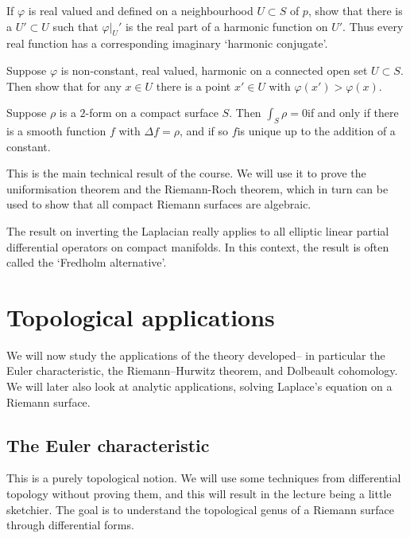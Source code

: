 \begin{exercise}
    If \(\varphi\) is real valued and defined on a neighbourhood \(U\subset
    S\) of \(p\), show that there is a \(U'\subset U\) such that
    \(\varphi|_U'\) is the real part of a harmonic function on \(U'\). Thus
    every real function has a corresponding imaginary `harmonic conjugate'.
\end{exercise}

\begin{exercise}
    Suppose \(\varphi\) is non-constant, real valued, harmonic on a
    connected open set \(U\subset S\). Then show that for any \(x\in U\) there
    is a point \(x'\in U\) with \(\varphi(x')>\varphi(x)\).
\end{exercise}

\begin{theorem}
    \label{thm:laplace-inversion}
    Suppose \(\rho\) is a \(2\)-form on a compact surface \(S\). Then
    \(\int_S\rho=0\)if and only if there is a smooth function \(f\) with
    \(\Delta f=\rho\), and if so \(f\)is unique up to the addition of a
    constant.
\end{theorem}

This is the main technical result of the course. We will use it to prove the
uniformisation theorem and the Riemann-Roch theorem, which in turn can be used
to show that all compact Riemann surfaces are algebraic.

\begin{remark}
    The result on inverting the Laplacian really applies to all elliptic linear
    partial differential operators on compact manifolds. In this context, the
    result is often called the `Fredholm alternative'.
\end{remark}

\section{Topological applications}

We will now study the applications of the theory developed-- in particular the
Euler characteristic, the Riemann--Hurwitz theorem, and Dolbeault cohomology.
 We will later also look at analytic
applications, solving Laplace's equation on a Riemann surface.

\subsection{The Euler characteristic} This is a purely topological notion. We
will use some techniques from differential topology without proving them, and
this will result in the lecture being a little sketchier. The goal is to
understand the topological genus of a Riemann surface through differential
forms.

